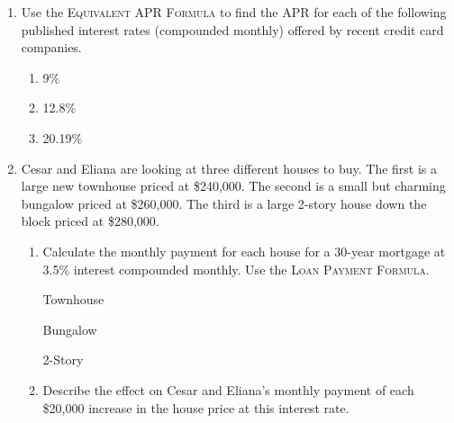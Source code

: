 \begin{enumerate}
\item Use the \textsc{Equivalent APR Formula} to find the APR for each of the following published interest rates (compounded monthly) offered by recent credit card companies.
\begin{enumerate}
\item 9\% \vfill
\item 12.8\%   \vfill
\item 20.19\% \vfill
\end{enumerate}

\newpage %

\item  Cesar and Eliana are looking at three different houses to buy.  The first is a large new townhouse priced at \$240,000.  The second is a small but charming bungalow priced at \$260,000.  The third is a large 2-story house down the block priced at \$280,000. 
 \begin{enumerate}
\item Calculate the monthly payment for each house for a 30-year mortgage at 3.5\% interest compounded monthly.   Use the \textsc{Loan Payment Formula}. 
\bigskip

Townhouse \vfill

Bungalow \vfill

2-Story \vfill

\item Describe the effect on Cesar and Eliana's monthly payment of each \$20,000 increase in the house price  at this interest rate. \vfill
\end{enumerate}

\end{enumerate}




